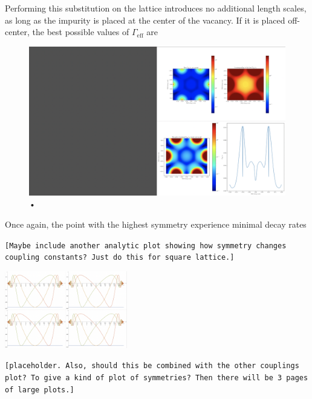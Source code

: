 \documentclass[aps,pra,superscriptaddress,twocolumn]{revtex4-1}
\newcommand{\commentSB}[1]{\texttt{\color{blue}[#1]}}
\begin{document}
Performing this substitution on the lattice introduces no additional length scales, as long as the impurity is placed at the center of the vacancy. If it is placed off-center, the best possible values of $\Gamma_\text{eff}$ are 


\begin{figure}
    \centering
    \includegraphics[width=1.0\textwidth]{figures/triangle_and_square_plaquette_substitution.png} 
    \caption{•}
    \label{fig:triangle_and_square_plaquette_substitution}
\end{figure}

Once again, the point with the highest symmetry experience minimal decay rates


\commentSB{Maybe include another analytic plot showing how symmetry changes coupling constants? Just do this for square lattice.}

\includegraphics[width=0.4\textwidth]{figures/triangle_and_square_substitution_coupling.png}

\commentSB{placeholder. Also, should this be combined with the other couplings plot? To give a kind of plot of symmetries? Then there will be 3 pages of large plots.}

\end{document}
